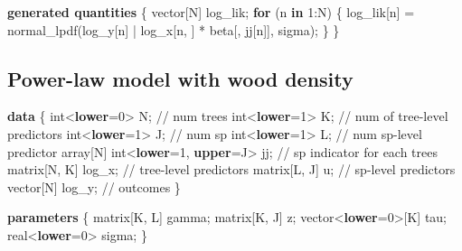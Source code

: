 \documentclass[
  12pt,
  letterpaper,
  DIV=11,
  numbers=noendperiod]{scrartcl}
\newenvironment{Shaded}{\begin{snugshade}}{\end{snugshade}}
\newcommand{\CommentTok}[1]{\textcolor[rgb]{0.37,0.37,0.37}{#1}}
\newcommand{\ControlFlowTok}[1]{\textcolor[rgb]{0.00,0.23,0.31}{\textbf{#1}}}
\newcommand{\DataTypeTok}[1]{\textcolor[rgb]{0.68,0.00,0.00}{#1}}
\newcommand{\DecValTok}[1]{\textcolor[rgb]{0.68,0.00,0.00}{#1}}
\newcommand{\KeywordTok}[1]{\textcolor[rgb]{0.00,0.23,0.31}{\textbf{#1}}}
\newcommand{\NormalTok}[1]{\textcolor[rgb]{0.00,0.23,0.31}{#1}}
\begin{document}
\begin{Shaded}
\begin{Highlighting}[]
\KeywordTok{generated quantities}\NormalTok{ \{}
  \DataTypeTok{vector}\NormalTok{[N] log\_lik;}
  \ControlFlowTok{for}\NormalTok{ (n }\ControlFlowTok{in} \DecValTok{1}\NormalTok{:N) \{}
\NormalTok{    log\_lik[n] = normal\_lpdf(log\_y[n] | log\_x[n, ] * beta[, jj[n]], sigma);}
\NormalTok{  \}}
\NormalTok{\}}
\end{Highlighting}
\end{Shaded}

\newpage

\subsection{Power-law model with wood
density}\label{power-law-model-with-wood-density}

\begin{Shaded}
\begin{Highlighting}[]
\KeywordTok{data}\NormalTok{ \{}
  \DataTypeTok{int}\NormalTok{\textless{}}\KeywordTok{lower}\NormalTok{=}\DecValTok{0}\NormalTok{\textgreater{} N;                    }\CommentTok{// num trees}
  \DataTypeTok{int}\NormalTok{\textless{}}\KeywordTok{lower}\NormalTok{=}\DecValTok{1}\NormalTok{\textgreater{} K;                    }\CommentTok{// num of tree{-}level predictors}
  \DataTypeTok{int}\NormalTok{\textless{}}\KeywordTok{lower}\NormalTok{=}\DecValTok{1}\NormalTok{\textgreater{} J;                    }\CommentTok{// num sp}
  \DataTypeTok{int}\NormalTok{\textless{}}\KeywordTok{lower}\NormalTok{=}\DecValTok{1}\NormalTok{\textgreater{} L;                    }\CommentTok{// num sp{-}level predictor}
  \DataTypeTok{array}\NormalTok{[N] }\DataTypeTok{int}\NormalTok{\textless{}}\KeywordTok{lower}\NormalTok{=}\DecValTok{1}\NormalTok{, }\KeywordTok{upper}\NormalTok{=J\textgreater{} jj; }\CommentTok{// sp indicator for each trees}
  \DataTypeTok{matrix}\NormalTok{[N, K] log\_x;                }\CommentTok{// tree{-}level predictors}
  \DataTypeTok{matrix}\NormalTok{[L, J] u;                    }\CommentTok{// sp{-}level predictors}
  \DataTypeTok{vector}\NormalTok{[N] log\_y;                   }\CommentTok{// outcomes}
\NormalTok{\}}

\KeywordTok{parameters}\NormalTok{ \{}
  \DataTypeTok{matrix}\NormalTok{[K, L] gamma;}
  \DataTypeTok{matrix}\NormalTok{[K, J] z;}
  \DataTypeTok{vector}\NormalTok{\textless{}}\KeywordTok{lower}\NormalTok{=}\DecValTok{0}\NormalTok{\textgreater{}[K] tau;}
  \DataTypeTok{real}\NormalTok{\textless{}}\KeywordTok{lower}\NormalTok{=}\DecValTok{0}\NormalTok{\textgreater{} sigma;}
\NormalTok{\}}


\end{Highlighting}
\end{Shaded}
\end{document}
